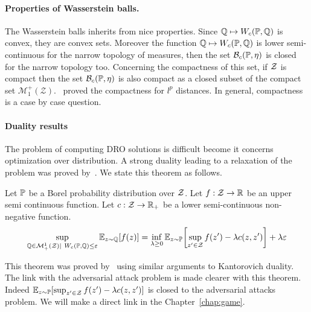 \paragraph{Properties of Wasserstein balls.} The Wasserstein balls inherits from nice properties. Since $\mathbb{Q}\mapsto  W_c(\mathbb{P},\mathbb{Q})$ is convex, they are convex sets. Moreover the function $\mathbb{Q}\mapsto  W_c(\mathbb{P},\mathbb{Q})$ is lower semi-continuous for the narrow topology of measures, then the set $\mathcal{B}_{c}(\mathbb{P},\eta) $ is closed for the narrow topology too. Concerning the compactness of this set, if $\mathcal{Z}$ is compact then the set $\mathcal{B}_{c}(\mathbb{P},\eta) $ is also compact as a closed subset of the compact set $\mathcal{M}^+_1(\mathcal{Z})$.~\cite{yue2020linear} proved the compactness for $l^p$ distances. In general, compactness is a case by case question. 


\paragraph{Duality results} The problem of computing DRO solutions is difficult become it concerns optimization over distribution. A strong duality leading to a relaxation of the problem was proved by~\cite{blanchet2019quantifying}. We state this theorem as follows.


\begin{thm}
    Let $\mathbb{P}$ be a Borel probability distribution over $\mathcal{Z}$. Let $f:\mathcal{Z}\to\mathbb{R}$ be an upper semi continuous function. Let $c:\mathcal{Z}\to\mathbb{R}_+$ be a lower semi-continuous non-negative function. 
    \begin{align*}
        \sup_{\QQ\in\mathcal{M}^1_+(\ZZ)\mid~W_c(\PP,\QQ)\leq \varepsilon}\mathbb{E}_{z\sim\QQ}\left[f(z)\right] = \inf_{\lambda\geq 0}\mathbb{E}_{z\sim\PP}\left[\sup_{z'\in\ZZ}f(z')-\lambda c(z,z')\right] +\lambda\varepsilon
    \end{align*}
  
\end{thm}

This theorem was proved by~\citep{blanchet2019quantifying} using similar arguments to Kantorovich duality. The link with the adversarial attack problem is made clearer with this theorem. Indeed $\mathbb{E}_{z\sim\PP}\left[\sup_{z'\in\ZZ}f(z')-\lambda c(z,z')\right]$ is closed to the adversarial attacks problem. We will make a direct link in the Chapter~\ref{chap:game}. %


